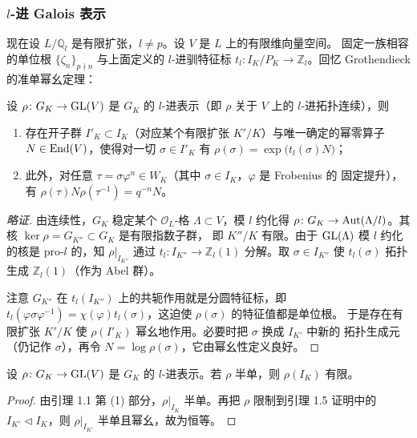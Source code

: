 \subsubsection{$l$-进 Galois 表示}

现在设 $L/\mathbb{Q}_l$ 是有限扩张，$l\neq p$。设 $V$ 是 $L$ 上的有限维向量空间。
固定一族相容的单位根 $\{\zeta_n\}_{p\nmid n}$ 与上面定义的 $l$-进驯特征标
$t_l\colon I_K/P_K\to\mathbb{Z}_l$。回忆 Grothendieck 的准单幂幺定理：

\begin{lemma}
设 $\rho\colon G_K\to\mathrm{GL}(V)$ 是 $G_K$ 的 $l$-进表示（即 $\rho$ 关于 $V$ 上的 $l$-进拓扑连续），则
\begin{enumerate}[label=(\arabic*),leftmargin=2.2em]
\item 存在开子群 $I'_K\subset I_K$（对应某个有限扩张 $K'/K$）与唯一确定的幂零算子
      $N\in\mathrm{End}(V)$，使得对一切 $\sigma\in I'_K$ 有 $\rho(\sigma)=\exp\bigl(t_l(\sigma)N\bigr)$；
\item 此外，对任意 $\tau=\sigma\varphi^{n}\in W_K$（其中 $\sigma\in I_K$，$\varphi$ 是 Frobenius 的
      固定提升），有 $\rho(\tau)N\rho(\tau^{-1})=q^{-n}N$。
\end{enumerate}
\end{lemma}

\begin{proof}[略证]
由连续性，$G_K$ 稳定某个 $\mathcal{O}_L$-格 $\Lambda\subset V$，模 $l$ 约化得
$\rho\colon G_K\to\mathrm{Aut}(\Lambda/l)$。其核 $\ker\rho=G_{K''}\subset G_K$ 是有限指数子群，
即 $K''/K$ 有限。由于 $\mathrm{GL}(\Lambda)$ 模 $l$ 约化的核是 pro-$l$ 的，知
$\rho|_{I_{K''}}$ 通过 $t_l\colon I_{K''}\to\mathbb{Z}_l(1)$ 分解。取 $\sigma\in I_{K''}$ 使
$t_l(\sigma)$ 拓扑生成 $\mathbb{Z}_l(1)$（作为 Abel 群）。

注意 $G_{K''}$ 在 $t_l(I_{K''})$ 上的共轭作用就是分圆特征标，即
$t_l(\varphi\sigma\varphi^{-1})=\chi(\varphi)t_l(\sigma)$，这迫使 $\rho(\sigma)$ 的特征值都是单位根。
于是存在有限扩张 $K'/K$ 使 $\rho(I'_K)$ 幂幺地作用。必要时把 $\sigma$ 换成 $I_{K'}$ 中新的
拓扑生成元（仍记作 $\sigma$），再令 $N=\log\rho(\sigma)$，它由幂幺性定义良好。
\end{proof}

\begin{corollary}
设 $\rho\colon G_K\to\mathrm{GL}(V)$ 是 $G_K$ 的 $l$-进表示。若 $\rho$ 半单，则 $\rho(I_K)$ 有限。
\end{corollary}

\begin{proof}
由引理 1.1 第 (1) 部分，$\rho|_{I_K}$ 半单。再把 $\rho$ 限制到引理 1.5 证明中的
$I_{K'}\triangleleft I_K$，则 $\rho|_{I_{K'}}$ 半单且幂幺，故为恒等。
\end{proof}

